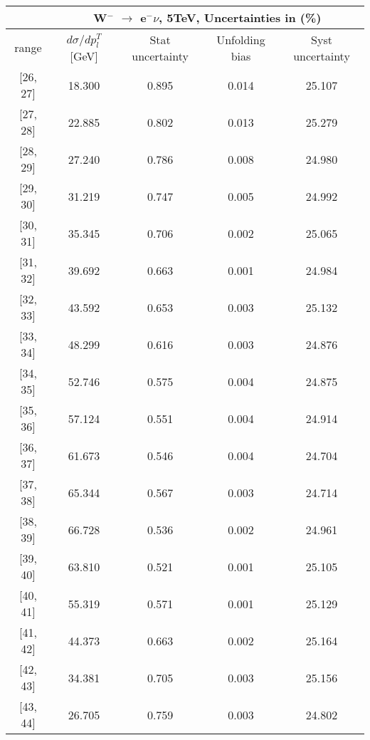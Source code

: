 \documentclass[12pt]{article}
\begin{document}
 
\begin{table}[] 
\begin{tabular}{c|c|c|c|c|}
\cline{2-5}
& \multicolumn{4}{c|}{W$^{-}$ $\rightarrow$ e$^{-} \nu $, 5TeV, Uncertainties in (\%)}  \\ \hline \hline 
\multicolumn{1}{|c|}{  range } & $d\sigma$/$dp^{T}_{l}$ [GeV]     & Stat uncertainty     & Unfolding bias     & Syst uncertainty        \\ \hline \hline 
\multicolumn{1}{|c|}{{[}26,  27{]}}  & 18.300 & 0.895 & 0.014 & 25.107 \\ \hline 
\multicolumn{1}{|c|}{{[}27,  28{]}}  & 22.885 & 0.802 & 0.013 & 25.279 \\ \hline 
\multicolumn{1}{|c|}{{[}28,  29{]}}  & 27.240 & 0.786 & 0.008 & 24.980 \\ \hline 
\multicolumn{1}{|c|}{{[}29,  30{]}}  & 31.219 & 0.747 & 0.005 & 24.992 \\ \hline 
\multicolumn{1}{|c|}{{[}30,  31{]}}  & 35.345 & 0.706 & 0.002 & 25.065 \\ \hline 
\multicolumn{1}{|c|}{{[}31,  32{]}}  & 39.692 & 0.663 & 0.001 & 24.984 \\ \hline 
\multicolumn{1}{|c|}{{[}32,  33{]}}  & 43.592 & 0.653 & 0.003 & 25.132 \\ \hline 
\multicolumn{1}{|c|}{{[}33,  34{]}}  & 48.299 & 0.616 & 0.003 & 24.876 \\ \hline 
\multicolumn{1}{|c|}{{[}34,  35{]}}  & 52.746 & 0.575 & 0.004 & 24.875 \\ \hline 
\multicolumn{1}{|c|}{{[}35,  36{]}}  & 57.124 & 0.551 & 0.004 & 24.914 \\ \hline 
\multicolumn{1}{|c|}{{[}36,  37{]}}  & 61.673 & 0.546 & 0.004 & 24.704 \\ \hline 
\multicolumn{1}{|c|}{{[}37,  38{]}}  & 65.344 & 0.567 & 0.003 & 24.714 \\ \hline 
\multicolumn{1}{|c|}{{[}38,  39{]}}  & 66.728 & 0.536 & 0.002 & 24.961 \\ \hline 
\multicolumn{1}{|c|}{{[}39,  40{]}}  & 63.810 & 0.521 & 0.001 & 25.105 \\ \hline 
\multicolumn{1}{|c|}{{[}40,  41{]}}  & 55.319 & 0.571 & 0.001 & 25.129 \\ \hline 
\multicolumn{1}{|c|}{{[}41,  42{]}}  & 44.373 & 0.663 & 0.002 & 25.164 \\ \hline 
\multicolumn{1}{|c|}{{[}42,  43{]}}  & 34.381 & 0.705 & 0.003 & 25.156 \\ \hline 
\multicolumn{1}{|c|}{{[}43,  44{]}}  & 26.705 & 0.759 & 0.003 & 24.802 \\ \hline 

\end{tabular}
\end{table}
\end{document}
